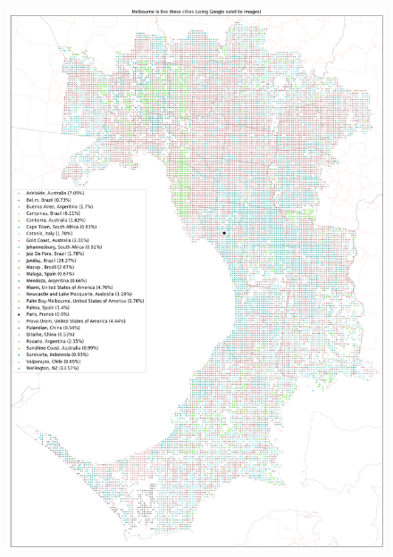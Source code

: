 \documentclass[sageh,times]{sagej}
\begin{document}
\begin{figure}[!htbp]
\centering    
\includegraphics[scale=0.15]{Images/MelbourneOverallAbrev_sat.png} 

\end{figure}
\end{document}
